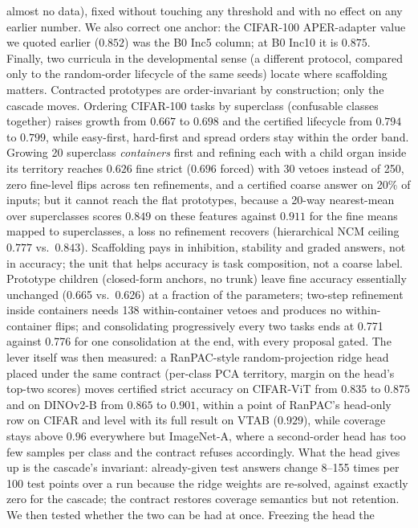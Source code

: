 \documentclass{article}
\begin{document}
almost no data), fixed without touching any threshold and with no effect on
any earlier number. We also correct one anchor: the CIFAR-100 APER-adapter
value we quoted earlier ($0.852$) was the B0 Inc5 column; at B0 Inc10 it is
$0.875$. Finally, two curricula in the developmental sense (a different
protocol, compared only to the random-order lifecycle of the same seeds) locate
where scaffolding matters. Contracted prototypes are order-invariant by
construction; only the cascade moves. Ordering CIFAR-100 tasks by superclass
(confusable classes together) raises growth from $0.667$ to
$0.698$ and the certified lifecycle from $0.794$ to
$0.799$, while easy-first, hard-first and spread orders stay within the order
band. Growing 20 superclass \emph{containers} first and refining each with a
child organ inside its territory reaches $0.626$ fine strict
($0.696$ forced) with 30 vetoes instead of
250, zero fine-level flips across ten refinements, and a certified
coarse answer on 20\% of inputs; but it cannot reach the flat
prototypes, because a 20-way nearest-mean over superclasses scores $0.849$ on
these features against $0.911$ for the fine means mapped to superclasses, a
loss no refinement recovers (hierarchical NCM ceiling $0.777$ vs.\ $0.843$).
Scaffolding pays in inhibition, stability and graded answers, not in accuracy;
the unit that helps accuracy is task composition, not a coarse label. Prototype children (closed-form anchors, no trunk) leave fine accuracy essentially unchanged (0.665 vs.\ 0.626) at a fraction of the parameters; two-step refinement inside containers needs 138 within-container vetoes and produces no within-container flips; and consolidating progressively every two tasks ends at 0.771 against 0.776 for one consolidation at the end, with every proposal gated. The lever itself was then measured: a RanPAC-style random-projection ridge
head placed under the same contract (per-class PCA territory, margin on the
head's top-two scores) moves certified strict accuracy on CIFAR-ViT from
$0.835$ to $0.875$ and on DINOv2-B from $0.865$ to $0.901$,
within a point of RanPAC's head-only row on CIFAR and level with its full result
on VTAB ($0.929$), while coverage stays above $0.96$ everywhere but
ImageNet-A, where a second-order head has too few samples per class and the
contract refuses accordingly. What the head gives up is the cascade's
invariant: already-given test answers change 8--155 times per 100
test points over a run because the ridge weights are re-solved, against exactly
zero for the cascade; the contract restores coverage semantics but not retention. We then tested whether the two can be had at once. Freezing the head the
\end{document}
